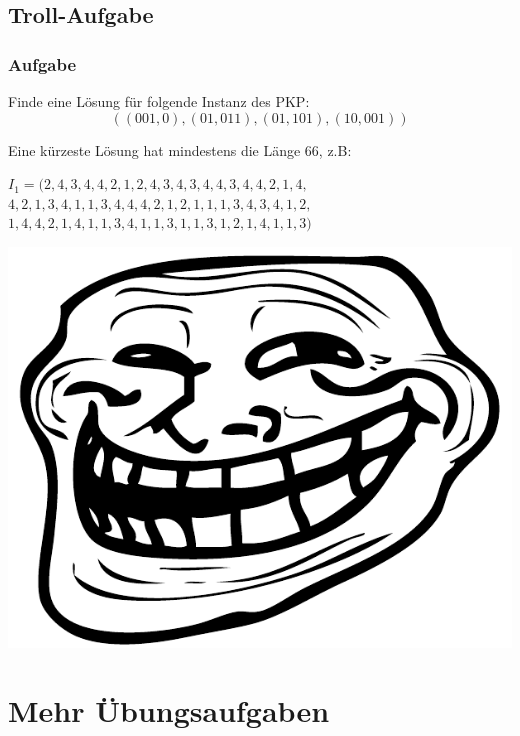 \subsection{Troll-Aufgabe}
\begin{frame}
\frametitle{Aufgabe}
Finde eine Lösung für folgende Instanz des PKP:
$$ ((001,0),(01,011),(01,101),(10,001)) $$

\invincible
\pause

Eine kürzeste Lösung hat mindestens die Länge 66, z.B:
\begin{center}
$ I_1 = (2, 4, 3, 4, 4, 2, 1, 2, 4, 3, 4, 3, 4, 4, 3, 4, 4, 2, 1, 4,$ \\
$4, 2, 1, 3, 4, 1, 1, 3, 4, 4, 4, 2, 1, 2, 1, 1, 1, 3, 4, 3, 4, 1, 2,$ \\
$1, 4, 4, 2, 1, 4, 1, 1, 3, 4, 1, 1, 3, 1, 1, 3, 1, 2, 1, 4, 1, 1, 3)$
\end{center}

\pause

\includegraphics{images/trollface}

\vincible

\end{frame}

\section{Mehr Übungsaufgaben}
